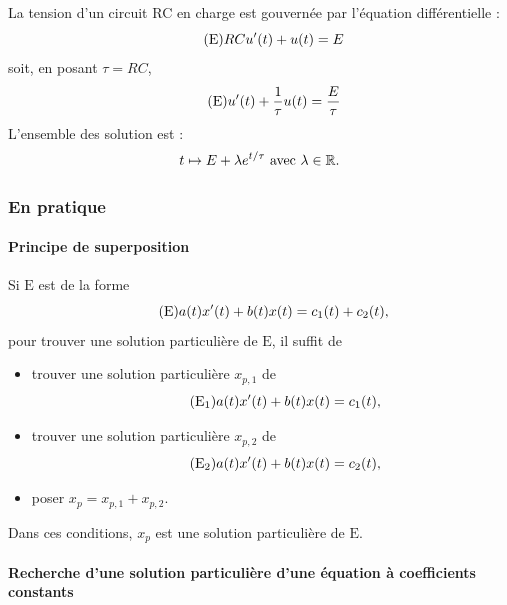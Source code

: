 \documentclass{book}
\begin{document}
\begin{Exemple}
La tension d'un circuit RC en charge est gouvernée par l'équation différentielle  :
\[\tag{$\mathrm{E}$}   RC u'(t) + u(t) = E\]
soit, en posant $\tau =RC$, 
\[\tag{$\mathrm{E}$}   u'(t) + \frac 1 \tau u(t) = \frac E \tau\]
L'ensemble des solution est  :
$$ t\mapsto E + \lambda e^{t/\tau}\text{ avec } \lambda \in \mathbb{R}.$$
\end{Exemple}

\subsubsection{En pratique}
\paragraph{Principe de superposition}
Si $\mathrm{E}$ est de la forme
\[\tag{$\mathrm{E}$} a(t) x'(t) + b(t) x(t) = c_1(t) + c_2(t),\]
pour trouver une solution particulière de $\mathrm{E}$, il suffit de
\begin{itemize}
\item trouver une solution particulière $x_{p,1}$ de
  \[\tag{$\mathrm{E_1}$} a(t) x'(t) + b(t) x(t) = c_1(t),\]
\item trouver une solution particulière $x_{p,2}$ de
  \[\tag{$\mathrm{E_2}$} a(t) x'(t) + b(t) x(t) = c_2(t),\]
\item poser $x_p = x_{p,1} + x_{p,2}$.
\end{itemize}
Dans ces conditions, $x_p$ est une solution particulière de $\mathrm{E}$.

\paragraph{Recherche d'une solution particulière d'une équation à coefficients constants}
\end{document}
